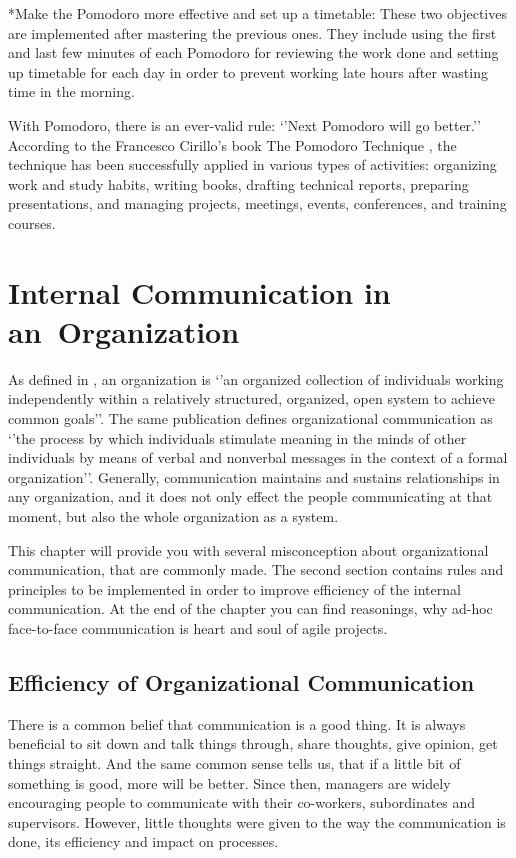 \documentclass[11pt,singleside]{myfithesis2}
\makeatletter
\renewcommand\paragraph{
   \vspace{-10pt}
   \@startsection{paragraph}{4}{0mm}
      {\baselineskip}
      {- 5pt}
      {\normalfont\normalsize\bfseries}
}
\makeatother
\begin{document}
\paragraph*{Make the Pomodoro more effective and set up a timetable: } These two objectives are implemented after mastering the previous ones. They include using the first and last few minutes of each Pomodoro for reviewing the work done and setting up timetable for each day in order to prevent working late hours after wasting time in the morning.

\vspace{\baselineskip}
With Pomodoro, there is an ever-valid rule: `'Next Pomodoro will go better.'' According to the Francesco Cirillo's book The Pomodoro Technique \cite{pomodoro}, the technique has been successfully applied in various types of activities: organizing work and study habits, writing books, drafting technical reports, preparing presentations, and managing projects, meetings, events, conferences, and training courses.


\chapter{Internal Communication in an~Organization}

As defined in \cite{orgCommForSurvival}, an organization is `'an organized collection of individuals working independently within a relatively structured, organized, open system to achieve common goals''. The same publication defines organizational communication as `'the process by which individuals stimulate meaning in the minds of other individuals by means of verbal and nonverbal messages in the context of a formal organization''. Generally, communication maintains and sustains relationships in any organization, and it does not only effect the people communicating at that moment, but also the whole organization as a system.

This chapter will provide you with several misconception about organizational communication, that are commonly made. The second section contains rules and principles to be implemented in order to improve efficiency of the internal communication. At the end of the chapter you can find reasonings, why ad-hoc face-to-face communication is heart and soul of agile projects.


	\section{Efficiency of Organizational Communication}\label{effOfOrgComm}
There is a common belief that communication is a good thing. It is always beneficial to sit down and talk things through, share thoughts, give opinion, get things straight. And the same common sense tells us, that if a little bit of something is good, more will be better. Since then, managers are widely encouraging people to communicate with their co-workers, subordinates and supervisors. However, little thoughts were given to the way the communication is done, its efficiency and impact on processes. 
\end{document}
